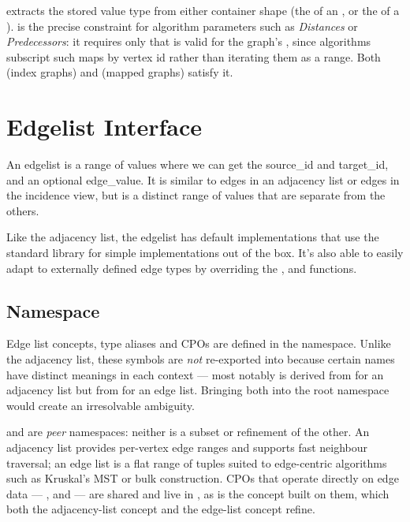  extracts the stored value type from
either container shape (the  of an , or the
 of a ).  is the
precise constraint for algorithm parameters such as \emph{Distances} or
\emph{Predecessors}: it requires only that  is valid for the graph's
, since algorithms subscript such maps by vertex id rather than
iterating them as a range. Both  (index graphs) and
 (mapped graphs) satisfy it.


\section{Edgelist Interface}
An edgelist is a range of values where we can get the source\_id and target\_id, and an optional edge\_value. It is similar to edges in an
adjacency list or edges in the incidence view, but is a distinct range of values that are separate from the others.

Like the adjacency list, the edgelist has default implementations that use the standard library for simple implementations out of the box.
It's also able to easily adapt to externally defined edge types by overriding the ,  and 
 functions.

\subsection{Namespace}
Edge list concepts, type aliases and CPOs are defined in the  namespace.
Unlike the adjacency list, these symbols are \emph{not} re-exported into  because
certain names have distinct meanings in each context --- most notably  is derived
from  for an adjacency list but from  for an edge list.
Bringing both into the root namespace would create an irresolvable ambiguity.

 and  are \emph{peer} namespaces: neither is a
subset or refinement of the other. An adjacency list provides per-vertex edge ranges and supports fast
neighbour traversal; an edge list is a flat range of  tuples suited to
edge-centric algorithms such as Kruskal's MST or bulk construction. CPOs that operate directly on
edge data --- ,  and  --- are shared and
live in , as is the  concept built on them, which both the
adjacency-list  concept and the edge-list  concept refine.


